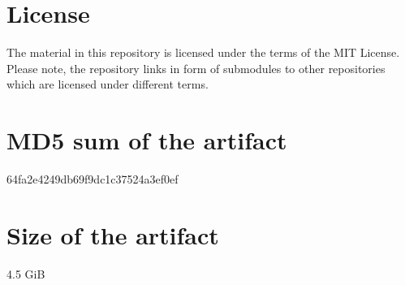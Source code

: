 \documentclass[a4paper,USenglish]{darts-v2019}
\newcommand{\license}[1]{{\section{License}#1}}
\newcommand{\mdsum}[1]{{\section{MD5 sum of the artifact}#1}}
\newcommand{\artifactsize}[1]{{\section{Size of the artifact}#1}}
\begin{document}
\license{The material in this repository is licensed under the terms of the MIT License. Please note, the repository links in form of submodules to other repositories which are licensed under different terms.}

\mdsum{64fa2e4249db69f9dc1c37524a3ef0ef}

\artifactsize{4.5 GiB}





% 

\end{document}
